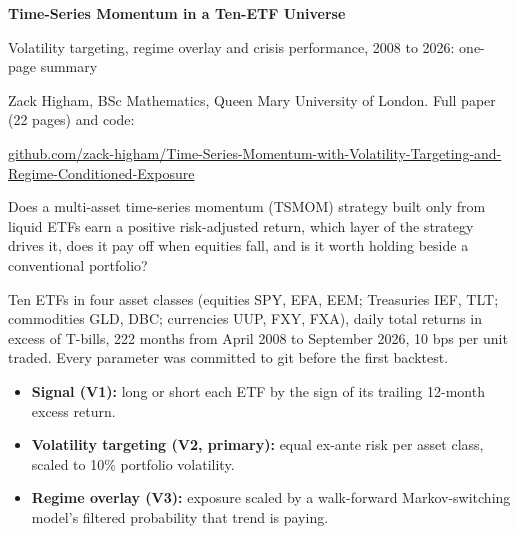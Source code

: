 \documentclass[10pt,a4paper]{article}
\newcommand{\head}[1]{\vspace{2pt}{\large\bfseries #1}\par\vspace{1pt}}
\begin{document}
{\LARGE\bfseries Time-Series Momentum in a Ten-ETF Universe}\par
\vspace{2pt}
{\large Volatility targeting, regime overlay and crisis performance, 2008 to 2026: one-page summary}\par
\vspace{2pt}
Zack Higham, BSc Mathematics, Queen Mary University of London. Full paper (22 pages) and code:\par
{\small\href{https://github.com/zack-higham/Time-Series-Momentum-with-Volatility-Targeting-and-Regime-Conditioned-Exposure}{github.com/zack-higham/Time-Series-Momentum-with-Volatility-Targeting-and-Regime-Conditioned-Exposure}}

\head{Question}
Does a multi-asset time-series momentum (TSMOM) strategy built only from liquid ETFs earn a positive risk-adjusted return, which layer of the strategy drives it, does it pay off when equities fall, and is it worth holding beside a conventional portfolio?

\head{Data and design}
Ten ETFs in four asset classes (equities SPY, EFA, EEM; Treasuries IEF, TLT; commodities GLD, DBC; currencies UUP, FXY, FXA), daily total returns in excess of T-bills, 222 months from April 2008 to September 2026, 10 bps per unit traded. Every parameter was committed to git before the first backtest.
\begin{itemize}
\item \textbf{Signal (V1):} long or short each ETF by the sign of its trailing 12-month excess return.
\item \textbf{Volatility targeting (V2, primary):} equal ex-ante risk per asset class, scaled to 10\% portfolio volatility.
\item \textbf{Regime overlay (V3):} exposure scaled by a walk-forward Markov-switching model's filtered probability that trend is paying.
\end{itemize}
\end{document}
